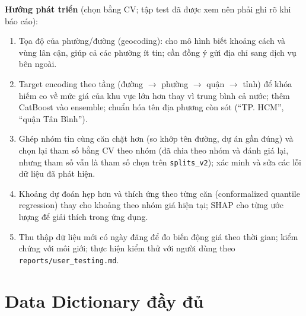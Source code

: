 \documentclass[11pt]{article}
\begin{document}
\textbf{Hướng phát triển} (chọn bằng CV; tập test đã được xem nên phải ghi rõ khi báo cáo):
\begin{enumerate}
    \item Tọa độ của phường/đường (geocoding): cho mô hình biết khoảng cách và vùng lân cận, giúp cả các phường ít
          tin; cần đồng ý gửi địa chỉ sang dịch vụ bên ngoài.
    \item Target encoding theo tầng (đường $\rightarrow$ phường $\rightarrow$ quận $\rightarrow$ tỉnh) để khóa hiếm co về mức
          giá của khu vực lớn hơn thay vì trung bình cả nước; thêm CatBoost vào ensemble; chuẩn hóa tên địa phương
          còn sót (``TP. HCM'', ``quận Tân Bình'').
    \item Ghép nhóm tin cùng căn chặt hơn (so khớp tên đường, dự án gần đúng) và chọn lại tham số bằng CV theo nhóm
          (đã chia theo nhóm và đánh giá lại, nhưng tham số vẫn là tham số chọn trên \texttt{splits\_v2}); xác minh và
          sửa các lỗi dữ liệu đã phát hiện.
    \item Khoảng dự đoán hẹp hơn và thích ứng theo từng căn (conformalized quantile regression) thay cho khoảng theo
          nhóm giá hiện tại; SHAP cho từng ước lượng để giải
          thích trong ứng dụng.
    \item Thu thập dữ liệu mới có ngày đăng để đo biến động giá theo thời gian; kiểm chứng với môi giới; thực hiện
          kiểm thử với người dùng theo \nolinkurl{reports/user_testing.md}.
\end{enumerate}

\appendix
\section{Data Dictionary đầy đủ}
\end{document}
